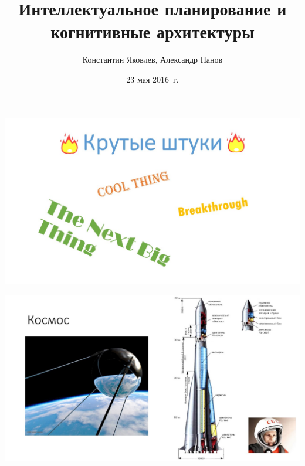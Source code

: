 \documentclass[default]{beamer}
\begin{document}
	
	\title[ИПиКА]{Интеллектуальное планирование и когнитивные архитектуры}
	\author[Панов,Яковлев]{Константин Яковлев, Александр Панов}
	\date{23 мая 2016~г.} 
	
	\begin{frame}
		\titlepage
	\end{frame}

	\begin{frame}
		
		\includegraphics[width=\textwidth]{advert/slide2.jpg}
	\end{frame}
	
	\begin{frame}
		\includegraphics[width=\textwidth]{advert/slide3.jpg}		
	\end{frame}
\end{document}
